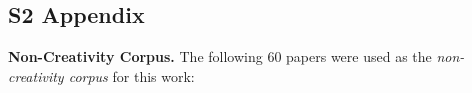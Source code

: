 \documentclass[10pt,letterpaper]{article}
\begin{document}
\subsection*{S2 Appendix}\label{S2_Appendix}
{\bf Non-Creativity Corpus.} The following 60 papers were used as the {\em non-creativity corpus} for this work:

\end{document}
